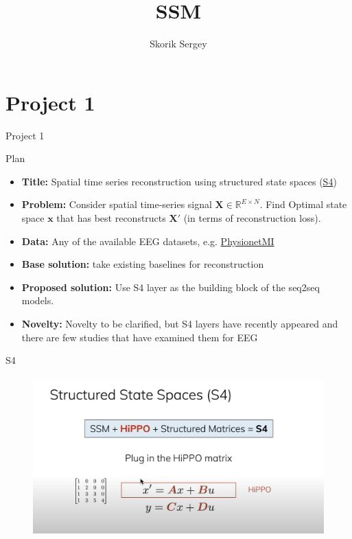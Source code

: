 \documentclass{beamer}
\title{SSM}
\author{Skorik Sergey}
\institute{MIPT, 2023}
\begin{document}


\section{Project 1}

\begin{frame}{Project 1}
    \begin{block}{Plan}
        \begin{itemize}
            \item \textbf{Title:} Spatial time series reconstruction using structured state spaces (\href{https://arxiv.org/abs/2111.00396}{S4})
            \item \textbf{Problem:} Consider spatial time-series signal $\mathbf{X}\in\mathbb{R}^{E\times N}$. Find Optimal state space $\mathbf{x}$ that has best reconstructs $\mathbf{X}'$ (in terms of reconstruction loss).
            \item \textbf{Data:} Any of the available EEG datasets, e.g. \href{https://neurotechx.github.io/moabb/generated/moabb.datasets.PhysionetMI.html#moabb.datasets.PhysionetMI}{PhysionetMI}
            \item \textbf{Base solution:} take existing baselines for reconstruction
            \item \textbf{Proposed solution:} Use S4 layer as the building block of the seq2seq models.
            \item \textbf{Novelty:} Novelty to be clarified, but S4 layers have recently appeared and there are few studies that have examined them for EEG
        \end{itemize}
    \end{block}
\end{frame}

\begin{frame}{S4}
    \begin{figure}
        \centering
        \includegraphics[width=\textwidth]{S4.png}
    \end{figure}
\end{frame}
\end{document}

